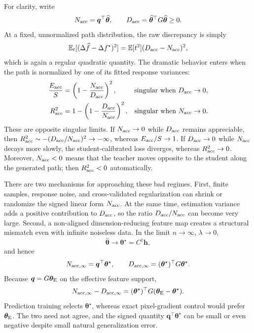 \documentclass[11pt]{article}
\newcommand{\E}{\mathbb{E}}
\newcommand{\that}{\widehat{\bm\theta}}
\newcommand{\tstar}{\bm\theta^{\star}}
\begin{document}
For clarity, write
\begin{equation}
  N_{\rm acc}=\bm q^{\top}\that,
  \qquad D_{\rm acc}=\that^{\top}G\that\geq 0.
\end{equation}
At a fixed, unnormalized path distribution, the raw discrepancy is simply
\begin{equation}
  \E_t[(\Delta\widehat f-\Delta f^{\star})^2]
  =\E[t^2](D_{\rm acc}-N_{\rm acc})^2,
  \label{eq:raw-path-loss}
\end{equation}
which is again a regular quadratic quantity.  The dramatic behavior enters
when the path is normalized by one of its fitted response variances:
\begin{align}
  \frac{E_{\rm acc}}{S}
    &=\left(1-\frac{N_{\rm acc}}{D_{\rm acc}}\right)^2,
    &\text{singular when }D_{\rm acc}\to0,\label{eq:eacc-singularity}\\
  R^2_{\rm acc}
    &=1-\left(1-\frac{D_{\rm acc}}{N_{\rm acc}}\right)^2,
    &\text{singular when }N_{\rm acc}\to0.\label{eq:r2acc-singularity}
\end{align}
These are opposite singular limits.  If $N_{\rm acc}\to0$ while
$D_{\rm acc}$ remains appreciable, then
$R^2_{\rm acc}\sim-(D_{\rm acc}/N_{\rm acc})^2\to-\infty$, whereas
$E_{\rm acc}/S\to1$.  If $D_{\rm acc}\to0$ while $N_{\rm acc}$ decays more
slowly, the student-calibrated loss diverges, whereas $R^2_{\rm acc}\to0$.
Moreover, $N_{\rm acc}<0$ means that the teacher moves opposite to the
student along the generated path; then $R^2_{\rm acc}<0$ automatically.

There are two mechanisms for approaching these bad regimes.  First, finite
samples, response noise, and cross-validated regularization can shrink or
randomize the signed linear form $N_{\rm acc}$.  At the same time, estimation
variance adds a positive contribution to $D_{\rm acc}$, so the ratio
$D_{\rm acc}/N_{\rm acc}$ can become very large.  Second, a non-aligned
dimension-reducing feature map creates a structural mismatch even with
infinite noiseless data.  In the limit $n\to\infty$, $\lambda\to0$,
\begin{equation}
  \that\longrightarrow\tstar=C^{\dagger}\bm h,
\end{equation}
and hence
\begin{equation}
  N_{\rm acc,\infty}=\bm q^{\top}\tstar,
  \qquad
  D_{\rm acc,\infty}=(\tstar)^{\top}G\tstar.
  \label{eq:structural-acc-gains}
\end{equation}
Because $\bm q=G\bm\theta_{\rm E}$ on the effective feature support,
\begin{equation}
  N_{\rm acc,\infty}-D_{\rm acc,\infty}
  =(\tstar)^{\top}G(\bm\theta_{\rm E}-\tstar).
  \label{eq:projection-mismatch-control}
\end{equation}
Prediction training selects $\tstar$, whereas exact pixel-gradient control
would prefer $\bm\theta_{\rm E}$.  The two need not agree, and the signed
quantity $\bm q^{\top}\tstar$ can be small or even negative despite small
natural generalization error.
\end{document}
